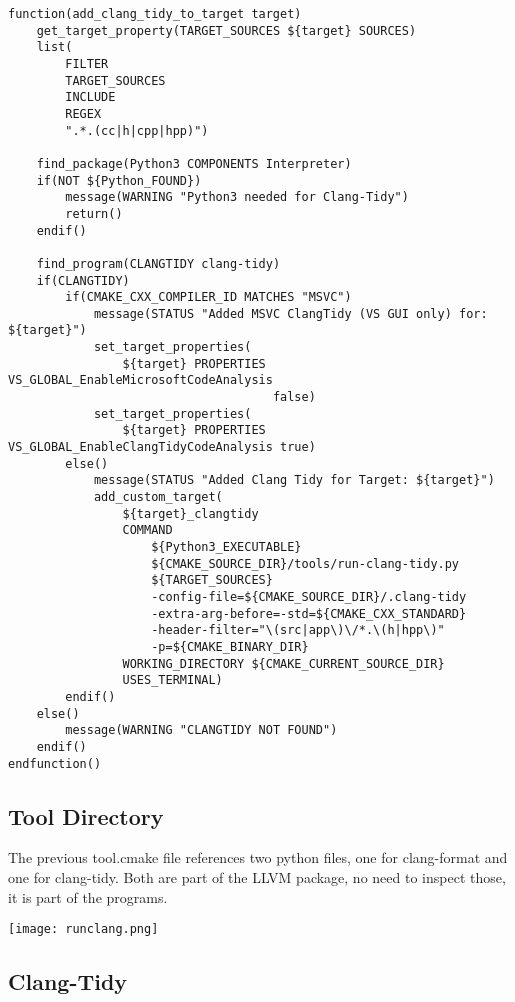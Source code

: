 \begin{verbatim}
function(add_clang_tidy_to_target target)
    get_target_property(TARGET_SOURCES ${target} SOURCES)
    list(
        FILTER
        TARGET_SOURCES
        INCLUDE
        REGEX
        ".*.(cc|h|cpp|hpp)")

    find_package(Python3 COMPONENTS Interpreter)
    if(NOT ${Python_FOUND})
        message(WARNING "Python3 needed for Clang-Tidy")
        return()
    endif()

    find_program(CLANGTIDY clang-tidy)
    if(CLANGTIDY)
        if(CMAKE_CXX_COMPILER_ID MATCHES "MSVC")
            message(STATUS "Added MSVC ClangTidy (VS GUI only) for: ${target}")
            set_target_properties(
                ${target} PROPERTIES VS_GLOBAL_EnableMicrosoftCodeAnalysis
                                     false)
            set_target_properties(
                ${target} PROPERTIES VS_GLOBAL_EnableClangTidyCodeAnalysis true)
        else()
            message(STATUS "Added Clang Tidy for Target: ${target}")
            add_custom_target(
                ${target}_clangtidy
                COMMAND
                    ${Python3_EXECUTABLE}
                    ${CMAKE_SOURCE_DIR}/tools/run-clang-tidy.py
                    ${TARGET_SOURCES}
                    -config-file=${CMAKE_SOURCE_DIR}/.clang-tidy
                    -extra-arg-before=-std=${CMAKE_CXX_STANDARD}
                    -header-filter="\(src|app\)\/*.\(h|hpp\)"
                    -p=${CMAKE_BINARY_DIR}
                WORKING_DIRECTORY ${CMAKE_CURRENT_SOURCE_DIR}
                USES_TERMINAL)
        endif()
    else()
        message(WARNING "CLANGTIDY NOT FOUND")
    endif()
endfunction()
\end{verbatim}


\subsection{Tool Directory}

The previous tool.cmake file references two python files, one for clang-format and one for clang-tidy.
Both are part of the LLVM package, no need to inspect those, it is part of the programs.

\begin{center}
    \texttt{[image: runclang.png]}
\end{center}

\subsection{Clang-Tidy}

